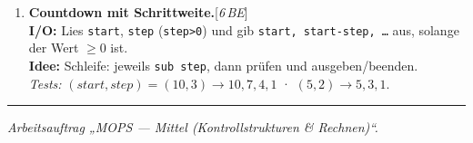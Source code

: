 \documentclass[11pt,a4paper]{scrartcl}
\newenvironment{aufgaben}{%
  \begin{enumerate}[leftmargin=*,label=\textbf{Aufgabe~\arabic*:}, itemsep=0.6em]
  }{\end{enumerate}}
\newcommand{\punkte}[1]{\hfill{\small[\textit{#1\,BE}]}}%
\begin{document}
\begin{aufgaben}
    \item \textbf{Countdown mit Schrittweite.}\punkte{6}\\
    \textbf{I/O:} Lies \texttt{start}, \texttt{step} (\texttt{step>0}) und gib \texttt{start, start-step, …} aus, solange der Wert $\ge 0$ ist.\\
    \textbf{Idee:} Schleife: jeweils \texttt{sub step}, dann prüfen und ausgeben/beenden.\\
    \emph{Tests:} $(start,step)=(10,3)\to 10,7,4,1$ \;·\; $(5,2)\to 5,3,1$.

  \end{aufgaben}

  \vfill
  \hrule
  \small\emph{Arbeitsauftrag „MOPS — Mittel (Kontrollstrukturen \& Rechnen)“.}
\end{document}
